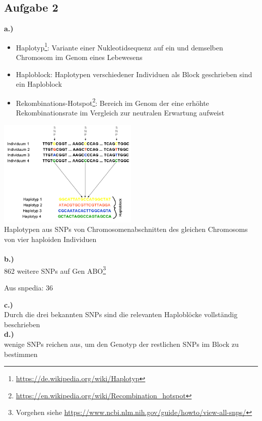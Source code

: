 \documentclass[13pt,a4paper]{article}
\begin{document}
\subsection{Aufgabe 2}
\textbf{a.)}
\begin{itemize}
	\item Haplotyp\footnote{\url{https://de.wikipedia.org/wiki/Haplotyp}}: Variante einer Nukleotidsequenz auf ein und demselben Chromosom im Genom eines Lebewesens
	\item Haploblock: Haplotypen verschiedener Individuen als Block geschrieben sind ein Haploblock
	\item Rekombinations-Hotspot\footnote{\url{https://en.wikipedia.org/wiki/Recombination_hotspot}}: Bereich im Genom der eine erhöhte Rekombinationsrate im Vergleich zur neutralen Erwartung aufweist
\end{itemize}

\includegraphics[width=0.5\textwidth]{pix/exercise10/Haplotyp.PNG}\\
Haplotypen aus SNPs von Chromosomenabschnitten des gleichen Chromosoms von vier haploiden Individuen
\\\\
\textbf{b.)}\\
862 weitere SNPs auf Gen ABO\footnote{Vorgehen siehe \url{https://www.ncbi.nlm.nih.gov/guide/howto/view-all-snps/}}

Aus snpedia: 36

\textbf{c.)}\\
Durch die drei bekannten SNPs sind die relevanten Haploblöcke vollständig beschrieben\\
\textbf{d.)}\\
wenige SNPs reichen aus, um den Genotyp der restlichen SNPs im Block zu bestimmen
\end{document}
